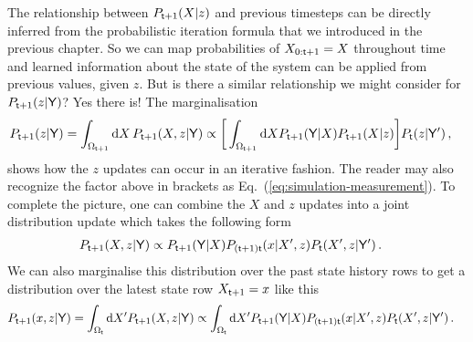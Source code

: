 The relationship between $P_{{\sf t}+1}(X\vert z)$ and previous timesteps can be directly inferred from the probabilistic iteration formula that we introduced in the previous chapter. So we can map probabilities of $X_{0:{\sf t}+1} = X$ throughout time and learned information about the state of the system can be applied from previous values, given $z$. But is there a similar relationship we might consider for $P_{{\sf t}+1}(z\vert {\sf Y})$? Yes there is! The marginalisation
\begin{align} 
P_{{\sf t}+1}(z\vert {\sf Y}) = \int_{\Omega_{{\sf t}+1}} {\rm d}X \, P_{{\sf t}+1}(X,z\vert {\sf Y}) &\propto \bigg[ \int_{\Omega_{{\sf t}+1}} {\rm d}X P_{{\sf t}+1}({\sf Y}\vert X) P_{{\sf t}+1}(X\vert z) \bigg] P_{{\sf t}}(z\vert {\sf Y}') \label{eq:z-update}\,,
\end{align}
shows how the $z$ updates can occur in an iterative fashion. The reader may also recognize the factor above in brackets as Eq.~(\ref{eq:simulation-measurement}). To complete the picture, one can combine the $X$ and $z$ updates into a joint distribution update which takes the following form 
\begin{align} 
P_{{\sf t}+1}(X,z\vert {\sf Y}) &\propto P_{{\sf t}+1}({\sf Y}\vert X) P_{({\sf t}+1){\sf t}}(x\vert X', z) P_{{\sf t}}(X',z\vert {\sf Y}') \label{eq:x-z-update}\,.
\end{align}
We can also marginalise this distribution over the past state history rows to get a distribution over the latest state row $X_{{\sf t}+1}=x$ like this 
\begin{align}
P_{{\sf t}+1}(x,z\vert {\sf Y}) &= \int_{\Omega_{{\sf t}}} {\rm d}X'P_{{\sf t}+1}(X,z\vert {\sf Y}) \propto \int_{\Omega_{{\sf t}}} {\rm d}X'P_{{\sf t}+1}({\sf Y}\vert X) P_{({\sf t}+1){\sf t}}(x\vert X', z) P_{{\sf t}}(X',z\vert {\sf Y}') \label{eq:x-z-update-latest-row} \,.
\end{align}

